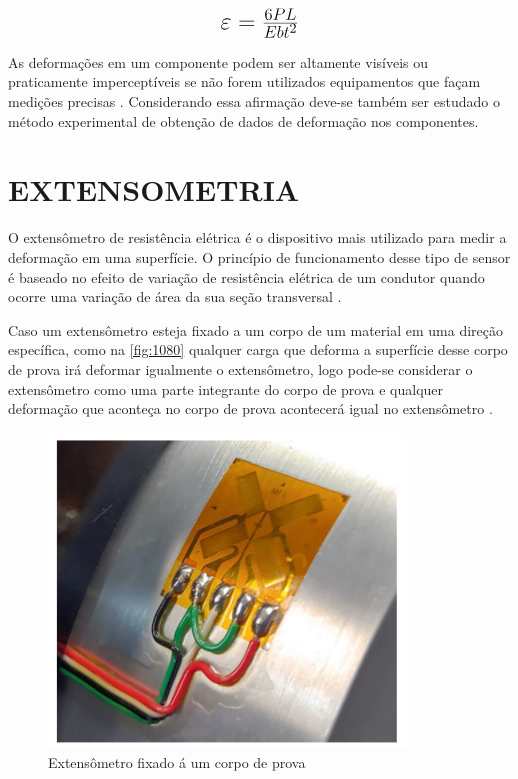 \begin{equation}\label{eq:Eq_201}%
\mbox{\fontsize{17.28}{21.6}\selectfont\( %
\varepsilon = \frac{6PL}{Eb{t^2}}
\)} %
\end{equation}

As deformações em um componente podem ser altamente visíveis ou praticamente imperceptíveis se não forem utilizados equipamentos que façam medições precisas
\autocite{Hibbeler2010}.
Considerando essa afirmação deve-se também ser estudado o método experimental de obtenção de dados de deformação nos componentes.

\section{EXTENSOMETRIA}

O extensômetro de resistência elétrica é o dispositivo mais utilizado para medir a deformação em uma superfície.
O princípio de funcionamento desse tipo de sensor é baseado no efeito de variação de resistência elétrica de um condutor quando
ocorre uma variação de área da sua seção transversal \autocite{Hollman2011}.

Caso um extensômetro esteja fixado a um corpo de um material em uma direção específica, como na \autoref{fig:1080} qualquer carga que deforma a superfície desse corpo de prova irá
deformar igualmente o extensômetro, logo pode-se considerar o extensômetro como uma parte integrante do corpo de prova e qualquer deformação que aconteça no corpo de
prova acontecerá igual no extensômetro \autocite{Hibbeler2010}.

\begin{figure}[htb]
	\caption{\label{fig:1080} Extensômetro fixado á um corpo de prova}
	\begin{center}
		\includegraphics[width=\textwidth]{pictures/1080.png}
	\end{center}
\end{figure}

